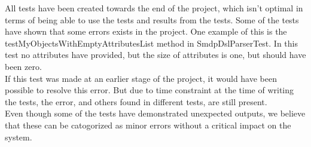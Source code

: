 \documentclass[paper=a4, fontsize=11pt]{scrartcl} %
\numberwithin{equation}{section} %
\numberwithin{figure}{section} %
\numberwithin{table}{section} %
\begin{document}
All tests have been created towards the end of the project, which isn't optimal in terms of being able to use the tests and results from the tests. Some of the tests have shown that some errors exists in the project. One example of this is the testMyObjectsWithEmptyAttributesList method in SmdpDslParserTest. In this test no attributes have provided, but the size of attributes is one, but should have been zero.\\
If this test was made at an earlier stage of the project, it would have been possible to resolve this error. But due to time constraint at the time of writing the tests, the error, and others found in different tests, are still present.\\
Even though some of the tests have demonstrated unexpected outputs, we believe that these can be catogorized as minor errors without a critical impact on the system. 
\end{document}
